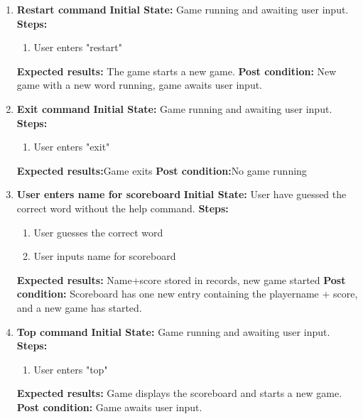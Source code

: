 \documentclass{article}
\begin{document}
{\begin{enumerate}
	\item \textbf{Restart command}\newline
	\textbf{Initial State:} Game running and awaiting user input.\newline
	\textbf{Steps:}
	\begin{enumerate}
	\item User enters "restart"
	\end{enumerate}
	\textbf{Expected results:} The game starts a new game.\newline
	\textbf{Post condition:} New game with a new word running, game awaits user input.\newline

	\item \textbf{Exit command}\newline
	\textbf{Initial State:} Game running and awaiting user input.\newline
	\textbf{Steps:}
	\begin{enumerate}
	\item User enters "exit"
	\end{enumerate}
	\textbf{Expected results:}Game exits\newline
	\textbf{Post condition:}No game running\newline

	\item \textbf{User enters name for scoreboard}\newline
	\textbf{Initial State:} User have guessed the correct word without the help command.\newline
	\textbf{Steps:}
	\begin{enumerate}
	\item User guesses the correct word
	\item User inputs name for scoreboard
	\end{enumerate}
	\textbf{Expected results:} Name+score stored in records, new game started\newline
	\textbf{Post condition:} Scoreboard has one new entry containing the playername + score, and a new game has started.\newline

	\item \textbf{Top command}\newline
	\textbf{Initial State:} Game running and awaiting user input.\newline
	\textbf{Steps:}
	\begin{enumerate}
	\item User enters "top"
	\end{enumerate}
	\textbf{Expected results:} Game displays the scoreboard and starts a new game.\newline
	\textbf{Post condition:} Game awaits user input.\newline
	\end{enumerate}

}
\end{document}
